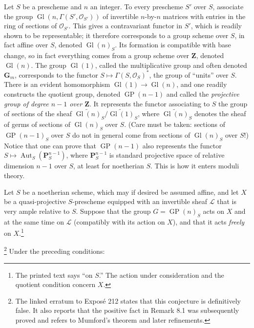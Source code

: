 Let $S$ be a prescheme and $n$ an integer. To every prescheme $S'$ over $S$,
associate the group $\operatorname{Gl}(n,\Gamma(S',\mathcal O_{S'}))$ of
invertible $n$-by-$n$ matrices with entries in the ring of sections of
$\mathcal O_{S'}$. This gives a contravariant functor in $S'$, which is readily
shown to be representable; it therefore corresponds to a group scheme over
$S$, in fact affine over $S$, denoted $\operatorname{Gl}(n)_S$. Its formation
is compatible with base change, so in fact everything comes from a group
scheme over $\mathbf Z$, denoted $\operatorname{Gl}(n)$. The group
$\operatorname{Gl}(1)$, called the multiplicative group and often denoted
$\mathbf G_m$, corresponds to the functor
$S\longmapsto\Gamma(S,\mathcal O_S)^*$, the group of ``units'' over $S$. There
is an evident homomorphism $\operatorname{Gl}(1)\to\operatorname{Gl}(n)$, and
one readily constructs the quotient group, denoted $\operatorname{GP}(n-1)$
and called the \emph{projective group of degree $n-1$ over $\mathbf Z$}. It
represents the functor associating to $S$ the group of sections of the sheaf
$\widetilde{\operatorname{Gl}(n)}_S/
\widetilde{\operatorname{Gl}(1)}_S$, where
$\widetilde{\operatorname{Gl}(n)}_S$ denotes the sheaf of germs of sections of
$\operatorname{Gl}(n)_S$ over $S$. (Care must be taken: sections of
$\operatorname{GP}(n-1)_S$ over $S$ do not in general come from sections of
$\operatorname{Gl}(n)_S$ over $S$!) Notice that one can prove that
$\operatorname{GP}(n-1)$ also represents the functor
$S\longmapsto\operatorname{Aut}_S(\mathbf P_S^{n-1})$, where
$\mathbf P_S^{n-1}$ is standard projective space of relative dimension $n-1$
over $S$, at least for noetherian $S$. This is how it enters moduli theory.

Let $S$ be a noetherian scheme, which may if desired be assumed affine, and
let $X$ be a quasi-projective $S$-prescheme equipped with an invertible sheaf
$\mathcal L$ that is very ample relative to $S$. Suppose that the group
$G=\operatorname{GP}(n)_S$ acts on $X$ and at the same time on $\mathcal L$
(compatibly with its action on $X$), and that it acts \emph{freely} on
$X$.\footnote{The printed text says ``on $S$.'' The action under consideration
and the quotient condition concern $X$.}

\footnote{The linked erratum to Exposé 212 states
that this conjecture is definitively false. It also reports that the positive
fact in Remark 8.1 was subsequently proved and refers to Mumford's theorem and
later refinements.} Under the preceding conditions:

